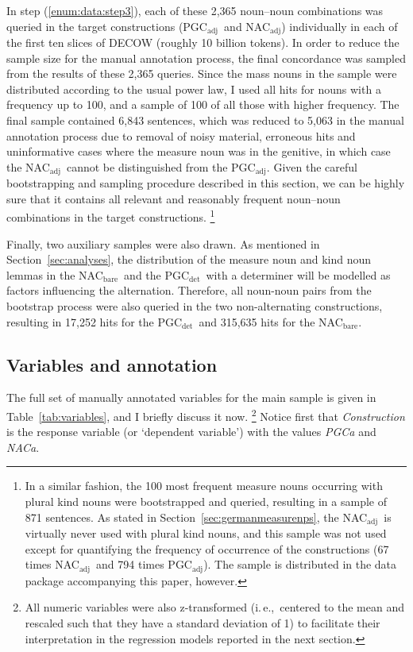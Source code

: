 \documentclass[USenglish]{article}
\newcommand{\ie}{i.\,e.,}
\newcommand{\Sub}[1]{\ensuremath{\mathrm{_{#1}}}}
\newcommand{\NACb}{NAC\Sub{bare}}
\newcommand{\NACa}{NAC\Sub{adj}}
\newcommand{\PGCd}{PGC\Sub{det}}
\newcommand{\PGCa}{PGC\Sub{adj}}
\begin{document}
In step (\ref{enum:data:step3}), each of these 2,365 noun–noun combinations was queried in the target constructions (\PGCa\ and \NACa) individually in each of the first ten slices of DECOW (roughly 10 billion tokens).
In order to reduce the sample size for the manual annotation process, the final concordance was sampled from the results of these 2,365 queries.
Since the mass nouns in the sample were distributed according to the usual power law, I used all hits for nouns with a frequency up to 100, and a sample of 100 of all those with higher frequency.
The final sample contained 6,843 sentences, which was reduced to 5,063 in the manual annotation process due to removal of noisy material, erroneous hits and uninformative cases where the measure noun was in the genitive, in which case the \NACa\ cannot be distinguished from the \PGCa.
Given the careful bootstrapping and sampling procedure described in this section, we can be highly sure that it contains all relevant and reasonably frequent noun–noun combinations in the target constructions.%
\footnote{In a similar fashion, the 100 most frequent measure nouns occurring with plural kind nouns were bootstrapped and queried, resulting in a sample of 871 sentences.
As stated in Section~\ref{sec:germanmeasurenps}, the \NACa\ is virtually never used with plural kind nouns, and this sample was not used except for quantifying the frequency of occurrence of the constructions (67 times \NACa\ and 794 times \PGCa).
The sample is distributed in the data package accompanying this paper, however.
}

Finally, two auxiliary samples were also drawn.
As mentioned in Section~\ref{sec:analyses}, the distribution of the measure noun and kind noun lemmas in the \NACb\ and the \PGCd\ with a determiner will be modelled as factors influencing the alternation.
Therefore, all noun-noun pairs from the bootstrap process were also queried in the two non-alternating constructions, resulting in 17,252 hits for the \PGCd\ and 315,635 hits for the \NACb.



\subsection{Variables and annotation}
\label{sec:annotation}

The full set of manually annotated variables for the main sample is given in Table~\ref{tab:variables}, and I briefly discuss it now.%
\footnote{All numeric variables were also z-transformed (\ie\ centered to the mean and rescaled such that they have a standard deviation of 1) to facilitate their interpretation in the regression models reported in the next section.}
Notice first that \textit{Construction} is the response variable (or `dependent variable') with the values \textit{PGCa} and \textit{NACa}.
\end{document}
